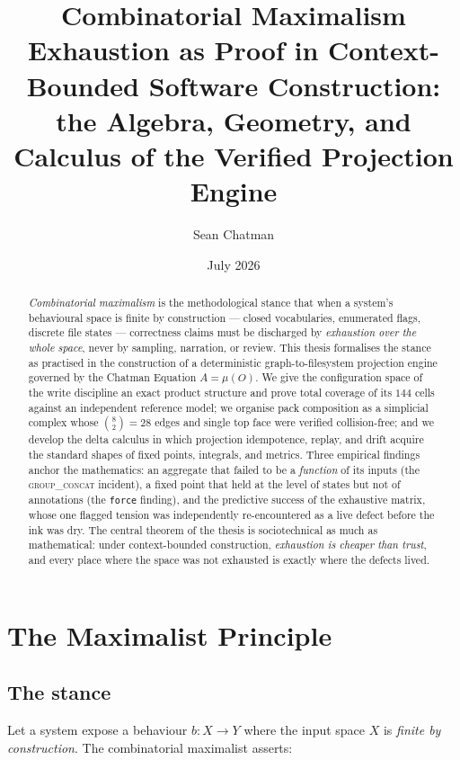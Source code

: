 \documentclass[11pt,a4paper]{report}
\title{\textbf{Combinatorial Maximalism}\\[0.6em]
\large Exhaustion as Proof in Context-Bounded Software Construction:\\
the Algebra, Geometry, and Calculus of the Verified Projection Engine}
\author{Sean Chatman}
\date{July 2026}
\theoremstyle{definition}
\theoremstyle{remark}
\newcommand{\mymu}{\mu}
\begin{document}
\maketitle

\begin{abstract}
\noindent
\emph{Combinatorial maximalism} is the methodological stance that when a system's
behavioural space is finite by construction --- closed vocabularies, enumerated
flags, discrete file states --- correctness claims must be discharged by
\emph{exhaustion over the whole space}, never by sampling, narration, or review.
This thesis formalises the stance as practised in the construction of a
deterministic graph-to-filesystem projection engine governed by the Chatman
Equation $A = \mymu(O)$. We give the configuration space of the write
discipline an exact product structure and prove total coverage of its
$144$ cells against an independent reference model; we organise pack
composition as a simplicial complex whose $\binom{8}{2}=28$ edges and single
top face were verified collision-free; and we develop the delta calculus in
which projection idempotence, replay, and drift acquire the standard shapes of
fixed points, integrals, and metrics. Three empirical findings anchor the
mathematics: an aggregate that failed to be a \emph{function} of its inputs
(the \textsc{group\_concat} incident), a fixed point that held at the level of
states but not of annotations (the \texttt{force} finding), and the
predictive success of the exhaustive matrix, whose one flagged tension was
independently re-encountered as a live defect before the ink was dry. The
central theorem of the thesis is sociotechnical as much as mathematical:
under context-bounded construction, \emph{exhaustion is cheaper than trust},
and every place where the space was not exhausted is exactly where the
defects lived.
\end{abstract}

\tableofcontents

\chapter{The Maximalist Principle}

\section{The stance}

Let a system expose a behaviour $b : X \to Y$ where the input space $X$ is
\emph{finite by construction}. The combinatorial maximalist asserts:
\end{document}
